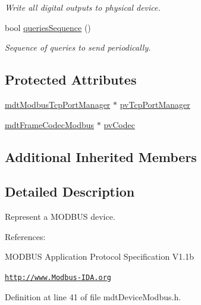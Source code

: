 \begin{DoxyCompactItemize}
\begin{DoxyCompactList}\small\item\em Write all digital outputs to physical device. \end{DoxyCompactList}\item 
bool \hyperlink{classmdt_device_modbus_a3b83b926ed1f9c3bdf7024de2745c285}{queries\-Sequence} ()
\begin{DoxyCompactList}\small\item\em Sequence of queries to send periodically. \end{DoxyCompactList}\end{DoxyCompactItemize}
\subsection*{Protected Attributes}
\begin{DoxyCompactItemize}
\item 
\hyperlink{classmdt_modbus_tcp_port_manager}{mdt\-Modbus\-Tcp\-Port\-Manager} $\ast$ \hyperlink{classmdt_device_modbus_a9ecbac63c29b229ab01f5fdb26008c95}{pv\-Tcp\-Port\-Manager}
\item 
\hyperlink{classmdt_frame_codec_modbus}{mdt\-Frame\-Codec\-Modbus} $\ast$ \hyperlink{classmdt_device_modbus_a2171d37ea720d546934f1c841e3c4d26}{pv\-Codec}
\end{DoxyCompactItemize}
\subsection*{Additional Inherited Members}


\subsection{Detailed Description}
Represent a M\-O\-D\-B\-U\-S device. 

References\-:
\begin{DoxyItemize}
\item M\-O\-D\-B\-U\-S Application Protocol Specification V1.\-1b
\item \href{http://www.Modbus-IDA.org}{\tt http\-://www.\-Modbus-\/\-I\-D\-A.\-org} 
\end{DoxyItemize}

Definition at line 41 of file mdt\-Device\-Modbus.\-h.



